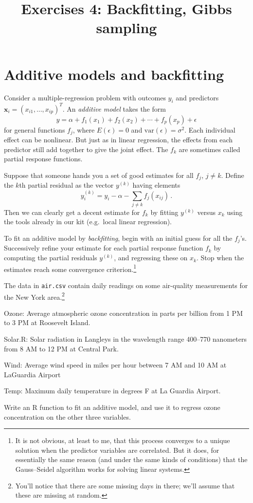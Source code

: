 \documentclass{mynotes}
\title[Exercises 4 $\cdot$ SSC 383D]{Exercises 4: Backfitting, Gibbs sampling}
\date{}  %
\newcommand{\var}{\mbox{var}}
\newcommand{\bx}{\mathbf{x}}
\begin{document}
\maketitle%

\section{Additive models and backfitting}

Consider a multiple-regression problem with outcomes $y_i$ and predictors $\bx_i = (x_{i1}, \ldots, x_{ip})^T$.  An \textit{additive model} takes the form
$$
y = \alpha + f_1(x_1) + f_2(x_2) + \cdots + f_p(x_p) + \epsilon
$$
for general functions $f_j$, where $E(\epsilon) = 0$ and $\var(\epsilon) = \sigma^2$.  Each individual effect can be nonlinear.  But just as in linear regression, the effects from each predictor still add together to give the joint effect.  The $f_k$ are sometimes called partial response functions.

Suppose that someone hands you a set of good estimates for all $f_j$, $j \neq k$.  Define the $k$th partial residual as the vector $y^{(k)}$ having elements
$$
y^{(k)}_i = y_i - \alpha - \sum_{j\neq k} f_j(x_{ij}) \, .
$$
Then we can clearly get a decent estimate for $f_k$ by fitting $y^{(k)}$ versus $x_k$ using the tools already in our kit (e.g.~local linear regression).

To fit an additive model by \textit{backfitting}, begin with an initial guess for all the $f_j$'s.  Successively refine your estimate for each partial response function $f_k$ by computing the partial residuals $y^{(k)}$, and regressing these on $x_k$.  Stop when the estimates reach some convergence criterion.\footnote{It is not obvious, at least to me, that this process converges to a unique solution when the predictor variables are correlated.  But it does, for essentially the same reason (and under the same kinds of conditions) that the Gauss--Seidel algorithm works for solving linear systems.}

The data in \verb|air.csv| contain daily readings on some air-quality measurements for the New York area.\footnote{You'll notice that there are some missing days in there; we'll assume that these are missing at random.}
\begin{compactdesc}
\item[Ozone:] Average atmospheric ozone concentration in parts per billion from 1 PM to 3 PM at Roosevelt Island.
\item[Solar.R:] Solar radiation in Langleys in the wavelength range 400--770 nanometers from 8 AM to 12 PM at Central Park.
\item[Wind:] Average wind speed in miles per hour between 7 AM and 10 AM at LaGuardia Airport
\item[Temp:] Maximum daily temperature in degrees F at La Guardia Airport.
\end{compactdesc}
\vspace{0.5\baselineskip}
Write an R function to fit an additive model, and use it to regress ozone concentration on the other three variables.
\end{document}
